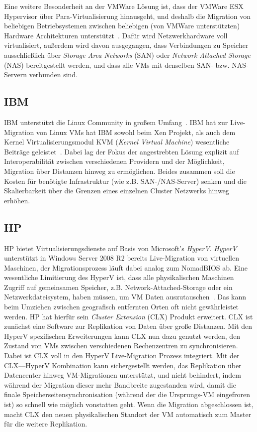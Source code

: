 Eine weitere Besonderheit an der VMWare Lösung ist, dass der VMWare
ESX Hypervisor über Para-Virtualisierung hinausgeht, und deshalb die
Migration von beliebigen Betriebsystemen zwischen beliebigen (von
VMWare unterstützten) Hardware Architekturen
unterstützt~\cite{nelson2005fast}. Dafür wird Netzwerkhardware voll
virtualisiert, außerdem wird davon ausgegangen, dass Verbindungen zu
Speicher ausschließlich über \emph{Storage Area Networks} (SAN) oder
\emph{Network Attached Storage} (NAS) bereitgestellt werden, und dass
alle VMs mit denselben SAN- bzw. NAS-Servern verbunden sind.

\subsection{IBM}
IBM unterstützt die Linux Community in großem
Umfang~\cite{kroahhartman2007linux}. IBM hat zur Live-Migration von
Linux VMs hat IBM sowohl beim Xen Projekt, als auch dem Kernel
Virtualisierungsmodul KVM (\emph{Kernel Virtual Machine}) wesentliche
Beiträge geleistet~\cite{rochwerger2009reservoir}. Dabei lag der Fokus
der angestrebten Lösung explizit auf Interoperabilität zwischen
verschiedenen Providern und der Möglichkeit, Migration über Distanzen
hinweg zu ermöglichen. Beides zusammen soll die Kosten für benötigte
Infrastruktur (wie z.B. SAN-/NAS-Server) senken und die Skalierbarkeit
über die Grenzen eines einzelnen Cluster Netzwerks hinweg erhöhen. 

\subsection{HP}
HP bietet Virtualisierungsdienste auf Basis von Microsoft's
\emph{HyperV}. \emph{HyperV} unterstützt in Windows Server 2008 R2
bereits Live-Migration von virtuellen Maschinen, der Migrationsprozess
läuft dabei analog zum NomadBIOS ab. Eine wesentliche Limitierung des
HyperV ist, dass alle physikalischen Maschinen Zugriff auf gemeinsamen
Speicher, z.B. Network-Attached-Storage oder ein Netzwerkdateisystem,
haben müssen, um VM Daten auszutauschen~\cite{hp2010hyperV}. Das kann
beim Umziehen zwischen geografisch entfernten Orten oft nicht
gewährleistet werden. HP hat hierfür sein \emph{Cluster Extension}
(CLX) Produkt erweitert. CLX ist zunächst eine Software zur
Replikation von Daten über große Distanzen. Mit den HyperV
spezifischen Erweiterungen kann CLX nun dazu genutzt werden, den
Zustand von VMs zwischen verschiedenen Rechenzentren zu
synchronisieren. Dabei ist CLX voll in den HyperV Live-Migration
Prozess integriert. Mit der CLX---HyperV Kombination kann
sichergestellt werden, das Replikation über Datencenter hinweg
VM-Migrationen unterstützt, und nicht behindert, indem während der
Migration dieser mehr Bandbreite zugestanden wird, damit die finale
Speicherseitensynchronisation (während der die Ursprungs-VM
eingefroren ist) so schnell wie möglich vonstatten geht. Wenn die
Migration abgeschlossen ist, macht CLX den neuen physikalischen
Standort der VM automatisch zum Master für die weitere Replikation.

